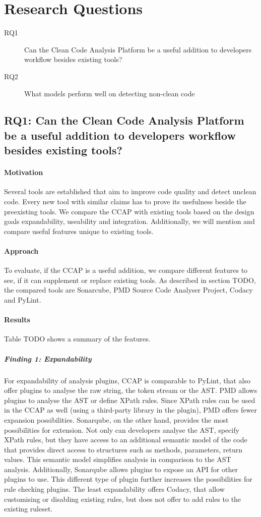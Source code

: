 \section{Research Questions}

\begin{description}
    \item[RQ1] Can the Clean Code Analysis Platform be a useful addition to developers workflow besides existing tools? 
    \item[RQ2] What models perform well on detecting non-clean code
\end{description}

\subsection{RQ1: Can the Clean Code Analysis Platform be a useful addition to developers workflow besides existing tools?}
\paragraph{Motivation}
Several tools are established that aim to improve code quality and detect unclean code. Every new tool with similar claims has to prove its usefulness beside the preexisting tools. We compare the CCAP with existing tools based on the design goals expandability, useability and integration. Additionally, we will mention and compare useful features unique to existing tools.
\paragraph{Approach}
To evaluate, if the CCAP is a useful addition, we compare different features to see, if it can supplement or replace existing tools. As described in section TODO, the compared tools are Sonarcube, PMD Source Code Analyser Project, Codacy and PyLint.

\paragraph{Results}
Table TODO shows a summary of the features.

\subparagraph{Finding 1: Expandability}
For expandability of analysis plugins, CCAP is comparable to PyLint, that also offer plugins to analyse the raw string, the token stream or the AST. PMD allows plugins to analyse the AST or define XPath rules. Since XPath rules can be used in the CCAP as well (using a third-party library in the plugin), PMD offers fewer expansion possibilities. Sonarqube, on the other hand, provides the most possibilities for extension. Not only can developers analyse the AST, specify XPath rules, but they have access to an additional semantic model of the code that provides direct access to structures such as methods, parameters, return values. This semantic model simplifies analysis in comparison to the AST analysis.
Additionally, Sonarqube allows plugins to expose an API for other plugins to use. This different type of plugin further increases the possibilities for rule checking plugins. The least expandability offers Codacy, that allow customising or disabling existing rules, but does not offer to add rules to the existing ruleset.

